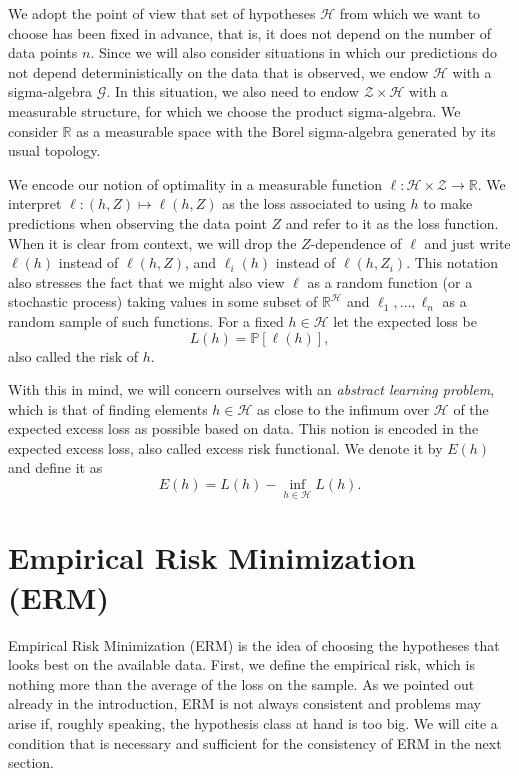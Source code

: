 \documentclass{uvamath}
\newcommand*{\reals}{\mathbb{R}}
\newcommand*{\calG}{\mathcal{G}}
\newcommand*{\calH}{\mathcal{H}}
\newcommand*{\calZ}{\mathcal{Z}}
\newcommand*{\bbP}{\mathbb{P}}
\theoremstyle{remark}
\theoremstyle{definition}
\theoremstyle{definition}
\theoremstyle{definition}
\theoremstyle{definition}
\theoremstyle{definition}
\begin{document}
We adopt the point of view that set of hypotheses $\calH$ from which
we want to choose has been fixed in advance, that is, it does not
depend on the number of data points $n$. Since we will also consider
situations in which our predictions do not depend deterministically on
the data that is observed, we endow $\calH$ with a sigma-algebra
$\calG$. In this situation, we also need to endow $\calZ\times \calH$
with a measurable structure, for which we choose the product
sigma-algebra. We consider $\reals$ as a measurable space with the
Borel sigma-algebra generated by its usual topology.

We encode our notion of optimality in a measurable function
$\ell: \calH \times \calZ\to \reals$. We interpret
$\ell:(h,Z)\mapsto\ell(h, Z)$ as the loss associated to using $h$ to
make predictions when observing the data point $Z$ and refer to it as
the loss function. When it is clear from context, we will drop the
$Z$-dependence of $\ell$ and just write $\ell(h)$ instead of
$\ell(h,Z)$, and $\ell_i(h)$ instead of $\ell(h,Z_i)$. This notation
also stresses the fact that we might also view $\ell$ as a random
function (or a stochastic process) taking values in some subset of
$\reals^\calH$ and $\ell_{1},\dots,\ell_n$ as a random sample of such
functions. For a fixed $h\in\calH$ let the expected loss be
\begin{equation*}
  L(h) = \bbP[\ell(h)],
\end{equation*}
also called the risk of $h$.

With this in mind, we will concern ourselves with an \textit{abstract
  learning problem}, which is that of finding elements $h\in\calH$ as
close to the infimum over $\calH$ of the expected excess loss as
possible based on data. This notion is encoded in the expected excess
loss, also called excess risk functional. We denote it by $E(h)$ and
define it as
\begin{equation*}
  E(h) = L(h) - \inf_{h\in \calH}L(h).
\end{equation*}


\section{Empirical Risk Minimization (ERM) \label{sect:erm_intro}}

Empirical Risk Minimization (ERM) is the idea of choosing the
hypotheses that looks best on the available data. First, we define the
empirical risk, which is nothing more than the average of the loss on
the sample. As we pointed out already in the introduction, ERM is not
always consistent and problems may arise if, roughly speaking, the
hypothesis class at hand is too big. We will cite a condition that is
necessary and sufficient for the consistency of ERM in the next
section.
\end{document}
